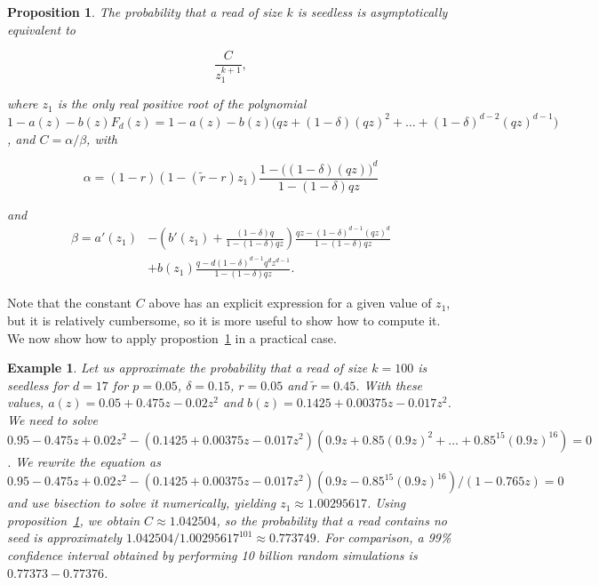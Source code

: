 \documentclass{article}
\newtheorem{example}{Example}
\newtheorem{proposition}{Proposition}
\begin{document}
\begin{proposition}
\label{th:pins}
The probability that a read of size $k$ is seedless is asymptotically
equivalent to

\begin{equation*}
\frac{C}{z_1^{k+1}},
\end{equation*}

\noindent
where $z_1$ is the only real positive root of the polynomial
$1-a(z)-b(z)F_d(z) = 1-a(z)-b(z)\big(qz+(1-\delta)(qz)^2 + \ldots +
(1-\delta)^{d-2}(qz)^{d-1}\big)$, and $C = \alpha / \beta$, with

\begin{equation*}
\alpha = (1-r)(1-(\tilde{r}-r)z_1)
   \frac{1-\big((1-\delta)(qz)\big)^d}{1-(1-\delta)qz}
\end{equation*}

\noindent
and
\begin{equation*}
\begin{split}
\beta = a'(z_1) &- \left( b'(z_1) +
\frac{(1-\delta)q}{1-(1-\delta)qz}\right)
\frac{qz-(1-\delta)^{d-1}(qz)^d}{1-(1-\delta)qz} \\
&+b(z_1) \frac{q-d(1-\delta)^{d-1}q^dz^{d-1}}{1-(1-\delta)qz}.
\end{split}
\end{equation*}
\end{proposition}

Note that the constant $C$ above has an explicit expression for a given
value of $z_1$, but it is relatively cumbersome, so it is more useful to
show how to compute it. We now show how to apply propostion~\ref{th:pins} in a
practical case.

\begin{example}
\label{ex:num3}
Let us approximate the probability that a read of size $k=100$ is seedless
for $d=17$ for $p=0.05$, $\delta=0.15$, $r=0.05$ and $\tilde{r}=0.45$.
With these values, $a(z) = 0.05 +0.475z -0.02z^2$ and $b(z) = 0.1425 +
0.00375z-0.017z^2$. We need to solve $0.95-0.475z+0.02z^2 - (0.1425
+0.00375z-0.017z^2)(0.9z+0.85(0.9z)^2+\ldots+0.85^{15}(0.9z)^{16}) = 0$.
We rewrite the equation as $0.95-0.475z+0.02z^2 - (0.1425
+0.00375z-0.017z^2)(0.9z-0.85^{15}(0.9z)^{16})/(1-0.765z) = 0$ and use
bisection to solve it numerically, yielding $z_1 \approx 1.00295617$.
Using proposition~\ref{th:pins}, we obtain $C \approx 1.042504$, so the
probability that a read contains no seed is approximately $1.042504 /
1.00295617^{101} \approx 0.773749$. For comparison, a 99\% confidence
interval obtained by performing 10 billion random simulations is
$0.77373-0.77376$.
\end{example}
\end{document}
